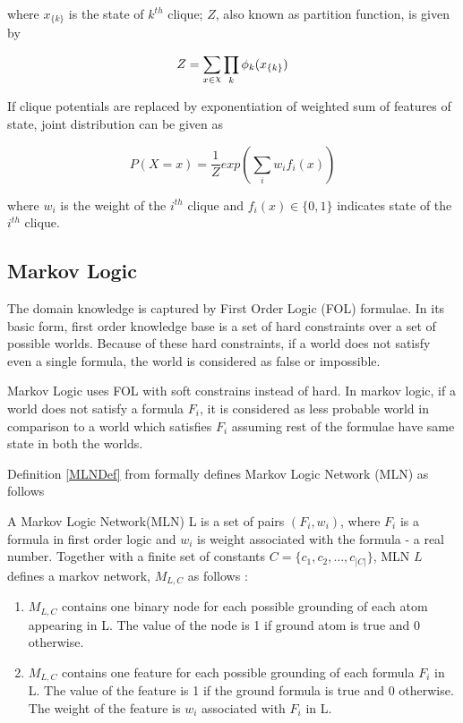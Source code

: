 where $x_{\{k\}}$ is the state of $k^{th}$ clique;
$Z$, also known as partition function, is given by

\begin{equation}
	\label{partitionFunc}
	Z = \displaystyle \sum_{x \in \rchi} \displaystyle \prod_{k} \phi_k(x_{\{k\}}) 
\end{equation}

If clique potentials are replaced by exponentiation of weighted sum of features of state,
joint distribution can be given as

\begin{equation}
	\label{jointDistWeighted}
	P(X = x) = \frac{1}{Z} exp \left( \displaystyle \sum_i w_i f_i(x) \right)
\end{equation}

where $w_i$ is the weight of the $i^{th}$ clique and $f_i(x) \in \{0,1\}$ indicates state 
of the $i^{th}$ clique.

\subsection{Markov Logic}
The domain knowledge is captured by First Order Logic (FOL) formulae. In its basic form, 
first order knowledge base is a set of hard constraints over a set of possible worlds.
Because of these hard constraints, if a world does not satisfy even a single formula,
the world is considered as false or impossible.

Markov Logic uses FOL with soft constrains instead of hard. In markov logic, if a world
does not satisfy a formula $F_i$, it is considered as less probable world in comparison to a
world which satisfies $F_i$ assuming rest of the formulae have same state in both the worlds.

Definition \ref{MLNDef} from \cite{MarkovLogic} formally defines 
Markov Logic Network (MLN) as follows

\begin{defn}
	\label{MLNDef}
	A Markov Logic Network(MLN) L is a set of pairs $(F_i, w_i)$, where $F_i$ is a
	formula in first order logic and $w_i$ is weight associated with the formula - a real number.
	Together with a finite set of constants $C = \{c_1, c_2,\ldots,c_{|C|}\}$, MLN $L$
	defines a markov network, $M_{L,C}$ as follows :

	\begin{enumerate}
		\item $M_{L,C}$ contains one binary node for each possible grounding
			of each atom appearing in L. The value of the node is 1 if ground
			atom is true and 0 otherwise.
		\item $M_{L,C}$ contains one feature for each possible grounding of each
			formula $F_i$ in L. The value of the feature is 1 if the ground
			formula is true and 0 otherwise. The weight of the feature is
			$w_i$ associated with $F_i$ in L.
	\end{enumerate}
\end{defn}

